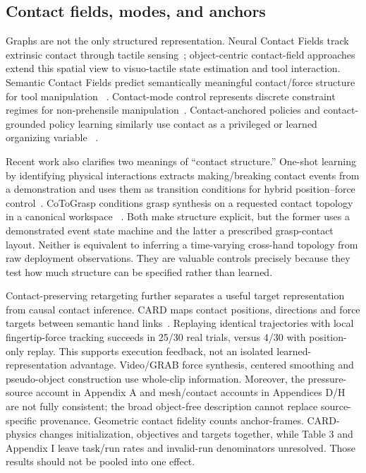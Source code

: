 \subsection{Contact fields, modes, and anchors}

Graphs are not the only structured representation. Neural Contact Fields track
extrinsic contact through tactile sensing~\cite{higuera2023ncf}; object-centric
contact-field approaches extend this spatial view to visuo-tactile state
estimation and tool interaction. Semantic Contact Fields predict semantically
meaningful contact/force structure for tool manipulation
~\cite{ma2026semanticcontact}. Contact-mode control represents discrete
constraint regimes for non-prehensile manipulation~\cite{oller2024extrinsic}.
Contact-anchored policies and contact-grounded policy learning similarly use
contact as a privileged or learned organizing variable
~\cite{cui2026contactanchored,xu2026contactgrounded}.

Recent work also clarifies two meanings of ``contact structure.'' One-shot
learning by identifying physical interactions extracts making/breaking contact
events from a demonstration and uses them as transition conditions for hybrid
position--force control~\cite{overbeek2026oneshot}. CoToGrasp conditions grasp
synthesis on a requested contact topology in a canonical workspace
~\cite{merand2026cotograsp}. Both make structure explicit, but the former uses a
demonstrated event state machine and the latter a prescribed grasp-contact layout.
Neither is equivalent to inferring a time-varying cross-hand topology from raw
deployment observations. They are valuable controls precisely because they test
how much structure can be specified rather than learned.

Contact-preserving retargeting further separates a useful target representation
from causal contact inference. CARD maps contact positions, directions and force
targets between semantic hand links~\cite{update2026card}. Replaying identical
trajectories with local fingertip-force tracking succeeds in 25/30 real trials,
versus 4/30 with position-only replay. This supports execution feedback, not an
isolated learned-representation advantage. Video/GRAB force synthesis, centered
smoothing and pseudo-object construction use whole-clip information. Moreover,
the pressure-source account in Appendix A and mesh/contact accounts in
Appendices D/H are not fully consistent; the broad object-free description
cannot replace source-specific provenance. Geometric contact fidelity counts
anchor-frames. CARD-physics changes initialization, objectives and targets
together, while Table 3 and Appendix I leave task/run rates and invalid-run
denominators unresolved. Those results should not be pooled into one effect.

